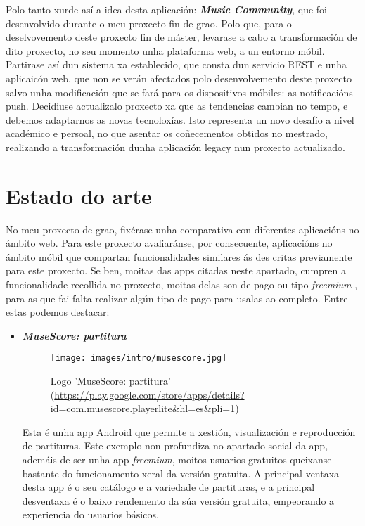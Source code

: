 Polo tanto xurde así a idea desta aplicación: \textbf{\textit{Music Community}}, que foi desenvolvido durante o meu proxecto fin de grao. Polo que, para o deselvovemento deste proxecto fin de máster, levarase a cabo a transformación de dito proxecto, no seu momento unha plataforma web, a un entorno móbil.  Partirase así dun sistema xa establecido, que consta dun servicio REST e unha aplicaicón web, que non se verán afectados polo desenvolvemento deste proxecto salvo unha modificación que se fará para os dispositivos móbiles: as notificacións push. Decidiuse actualizalo proxecto xa que as tendencias cambian no tempo, e debemos adaptarnos as novas tecnoloxías. Isto representa un novo desafío a nivel académico e persoal, no que asentar os coñecementos obtidos no mestrado, realizando a transformación dunha aplicación legacy nun proxecto actualizado.

\section{Estado do arte}
\label{sec:estado-arte}

No meu proxecto de grao, fixérase unha comparativa con diferentes aplicacións no ámbito web. Para este proxecto avaliaránse, por consecuente, aplicacións no ámbito móbil que compartan funcionalidades similares ás des critas previamente para este proxecto. Se ben, moitas das apps citadas neste apartado, cumpren a funcionalidade recollida no proxecto, moitas delas son de pago ou tipo \textit{freemium} , para as que fai falta realizar algún tipo de pago para usalas ao completo. Entre estas podemos destacar:

\begin{itemize}
	\item \textbf{\textit{MuseScore: partitura}} 
	
	\begin{figure}[h!]
		\centering
		\texttt{[image: images/intro/musescore.jpg]}
		\caption{Logo 'MuseScore: partitura' (\url{https://play.google.com/store/apps/details?id=com.musescore.playerlite&hl=es&pli=1})}
	\end{figure}
	
	Esta é unha app Android que permite a xestión, visualización e reproducción de partituras. Este exemplo non profundiza no apartado social da app, ademáis de ser unha app  \textit{freemium}, moitos usuarios gratuitos queixanse bastante do funcionamento xeral da versión gratuita.
	A principal ventaxa desta app é o seu catálogo e a variedade de partituras, e a principal desventaxa é o baixo rendemento da súa versión gratuita, empeorando a experiencia do usuarios básicos. 

\end{itemize}

